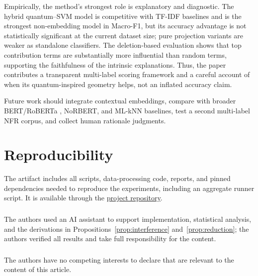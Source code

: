 \documentclass[runningheads]{llncs}
\begin{document}
Empirically, the method's strongest role is explanatory and diagnostic. The
hybrid quantum--SVM model is competitive with TF-IDF baselines and is the
strongest non-embedding model in Macro-F1, but its accuracy advantage is not
statistically significant at the current dataset size; pure projection variants
are weaker as standalone classifiers. The deletion-based evaluation shows that
top contribution terms are substantially more influential than random terms,
supporting the faithfulness of the intrinsic explanations. Thus, the paper
contributes a transparent multi-label scoring framework and a careful account
of when its quantum-inspired geometry helps, not an inflated accuracy claim.

Future work should integrate contextual embeddings, compare with broader
BERT/RoBERTa \cite{liu2019roberta}, NoRBERT, and ML-kNN
\cite{zhang2007mlknn} baselines, test a second multi-label NFR corpus, and
collect human rationale judgments.

\section*{Reproducibility}
The artifact includes all scripts, data-processing code, reports, and pinned
dependencies needed to reproduce the experiments, including an aggregate
runner script. It is available through the
\href{https://github.com/Lancelot-sys25/Quantum-Inspired-NFR-Classification}{project repository}.

\begin{credits}
\subsubsection{\ackname}
The authors used an AI assistant to support implementation, statistical
analysis, and the derivations in Propositions~\ref{prop:interference}
and~\ref{prop:reduction}; the authors verified all results and take full
responsibility for the content.

\subsubsection{\discintname}
The authors have no competing interests to declare that are relevant to the
content of this article.
\end{credits}



\end{document}
